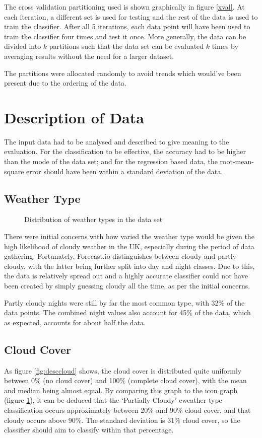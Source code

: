 \documentclass[a4paper,12pt,twoside]{report}
\begin{document}
The cross validation partitioning used is shown graphically in figure \ref{xval}. At each iteration, a different set is used for testing and the rest of the data is used to train the classifier. After all 5 iterations, each data point will have been used to train the classifier four times and test it once. More generally, the data can be divided into $k$ partitions such that the data set can be evaluated $k$ times by averaging results without the need for a larger dataset.

The partitions were allocated randomly to avoid trends which would've been present due to the ordering of the data.

\section{Description of Data}
The input data had to be analysed and described to give meaning to the evaluation. For the classification to be effective, the accuracy had to be higher than the mode of the data set; and for the regression based data, the root-mean-square error should have been within a standard deviation of the data.

\subsection{Weather Type}

\begin{figure}[htpb]
  \centering
  
  \caption{Distribution of weather types in the data set}
  \label{fig:descicon}
\end{figure}

There were initial concerns with how varied the weather type would be given the high likelihood of cloudy weather in the UK, especially during the period of data gathering. Fortunately, Forecast.io distinguishes between cloudy and partly cloudy, with the latter being further split into day and night classes. Due to this, the data is relatively spread out and a highly accurate classifier could not have been created by simply guessing cloudy all the time, as per the initial concerns.

Partly cloudy nights were still by far the most common type, with 32\% of the data points. The combined night values also account for 45\% of the data, which as expected, accounts for about half the data.

\subsection{Cloud Cover}

As figure \ref{fig:desccloud} shows, the cloud cover is distributed quite uniformly between 0\% (no cloud cover) and 100\% (complete cloud cover), with the mean and median being almost equal. By comparing this graph to the icon graph (figure \ref{fig:descicon}), it can be deduced that the `Partially Cloudy' cweather type classification occurs approximately between 20\% and 90\% cloud cover, and that cloudy occurs above 90\%. The standard deviation is 31\% cloud cover, so the classifier should aim to classify within that percentage.
\end{document}
